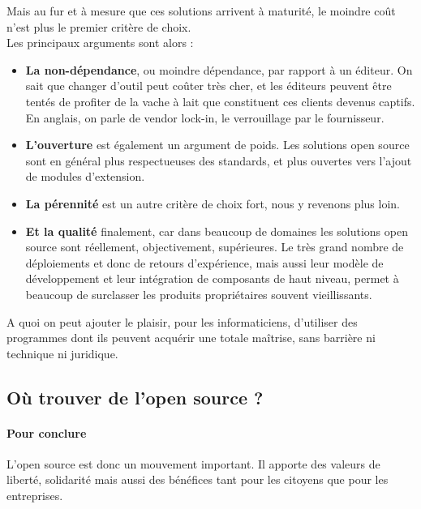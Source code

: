 			Mais au fur et à mesure que ces solutions arrivent à maturité, le moindre coût n'est plus le premier critère de choix.\\
			Les principaux arguments sont alors :\\


			\begin{itemize}[label=\textbullet, font=\LARGE \color{burntorange}]
				\item \textbf{La non-dépendance}, ou moindre dépendance, par rapport à un éditeur. On sait que changer d'outil peut coûter très cher, et les éditeurs peuvent être tentés de profiter de la vache à lait que constituent ces clients devenus captifs. En anglais, on parle de vendor lock-in, le verrouillage par le fournisseur.
				\item \textbf{L'ouverture} est également un argument de poids. Les solutions open source sont en général plus respectueuses des standards, et plus ouvertes vers l'ajout de modules d'extension.
				\item \textbf{La pérennité} est un autre critère de choix fort, nous y revenons plus loin.
				\item \textbf{Et la qualité} finalement, car dans beaucoup de domaines les solutions open source sont réellement, objectivement, supérieures. Le très grand nombre de déploiements et donc de retours d'expérience, mais aussi leur modèle de développement et leur intégration de composants de haut niveau, permet à beaucoup de surclasser les produits propriétaires souvent vieillissants.
			\end{itemize}

			A quoi on peut ajouter le plaisir, pour les informaticiens, d'utiliser des programmes dont ils peuvent acquérir une totale maîtrise, sans barrière ni technique ni juridique.

		\subsection{Où trouver de l'open source ?} 

		\paragraph{Pour conclure\\}

		L’open source est donc un mouvement important. Il apporte des valeurs de liberté, solidarité mais aussi des bénéfices tant pour les citoyens que pour les entreprises. 
		
